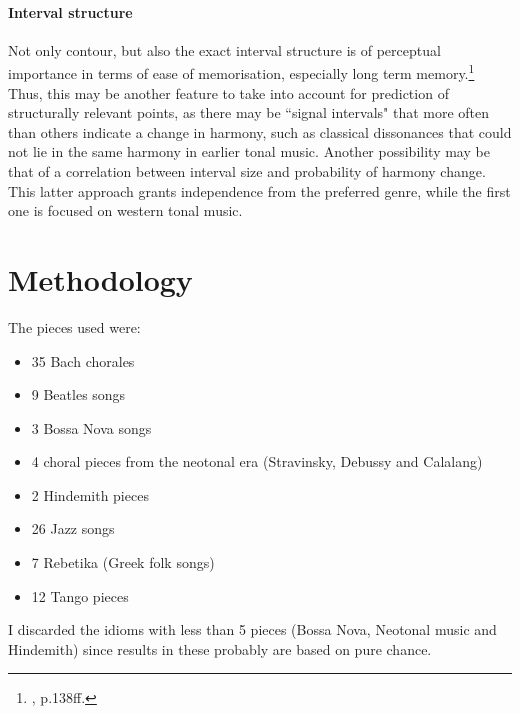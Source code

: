 \documentclass[a4paper,12pt]{report}
\begin{document}
\subsubsection{Interval structure}
Not only contour, but also the exact interval structure is of perceptual importance in terms of ease of memorisation, especially long term memory.\footnote{\cite{dowling1986music}, p.138ff.} Thus, this may be another feature to take into account for prediction of structurally relevant points, as there may be ``signal intervals" that more often than others indicate a change in harmony, such as classical dissonances that could not lie in the same harmony in earlier tonal music. Another possibility may be that of a correlation between interval size and probability of harmony change. This latter approach grants independence from the preferred genre, while the first one is focused on western tonal music.





\chapter{Methodology}
The pieces used were:
\vspace{1ex}
\begin{itemize}
	\item{35 Bach chorales}
	\item{9 Beatles songs}
	\item{3 Bossa Nova songs}
	\item{4 choral pieces from the neotonal era (Stravinsky, Debussy and Calalang)}
	\item{2 Hindemith pieces}
	\item{26 Jazz songs}
	\item{7 Rebetika (Greek folk songs)}
	\item{12 Tango pieces}
\end{itemize}
\vspace{2ex}
\par
I discarded the idioms with less than 5 pieces (Bossa Nova, Neotonal music and Hindemith) since results in these probably are based on pure chance.
\end{document}
